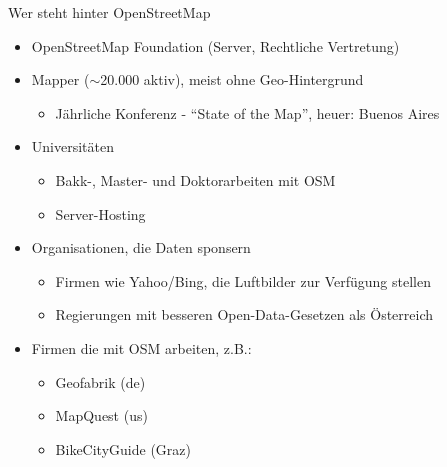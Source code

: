 \documentclass{beamer}
\begin{document}
\begin{frame}{Wer steht hinter OpenStreetMap}

  \begin{itemize}
    \item OpenStreetMap Foundation (Server, Rechtliche Vertretung)
      \pause
    \item Mapper ($\sim$20.000 aktiv), meist ohne Geo-Hintergrund
    \begin{itemize}
      \item Jährliche Konferenz - "`State of the Map"', heuer: Buenos Aires
    \end{itemize}
      \pause
    \item Universitäten
    \begin{itemize}
      \item Bakk-, Master- und Doktorarbeiten mit OSM
      \item Server-Hosting
    \end{itemize}
      \pause
    \item Organisationen, die Daten sponsern
    \begin{itemize}
      \item Firmen wie Yahoo/Bing, die Luftbilder zur Verfügung stellen
      \item Regierungen mit besseren Open-Data-Gesetzen als Österreich
    \end{itemize}
      \pause
    \item Firmen die mit OSM arbeiten, z.B.:
    \begin{itemize}
      \item Geofabrik (de)
      \item MapQuest (us)
      \item BikeCityGuide (Graz)
    \end{itemize}
  \end{itemize}



\end{frame}
\end{document}
